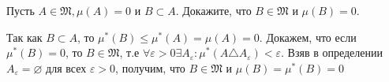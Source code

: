 \begin{task}{8}
Пусть $A \in \mathfrak{M}, \mu(A) = 0$ и $B \subset A$. Докажите, что
$B \in \mathfrak{M}$ и $\mu(B) = 0$.
\end{task}

\begin{solution}
Так как $B \subset A$, то $\mu^*(B) \leqslant \mu^*(A) = \mu(A) = 0$. Докажем, что если $\mu^*(B)= 0$, то $B \in \mathfrak{M}$, т.е $\forall \varepsilon > 0 \exists A_{\varepsilon}: \mu^*(A \triangle A_{\varepsilon}) < \varepsilon$. Взяв в определении $A_{\varepsilon} = \varnothing$ для всех $\varepsilon > 0$, получим, что $B \in \mathfrak{M}$ и $\mu(B) = \mu^*(B) = 0$
\end{solution}